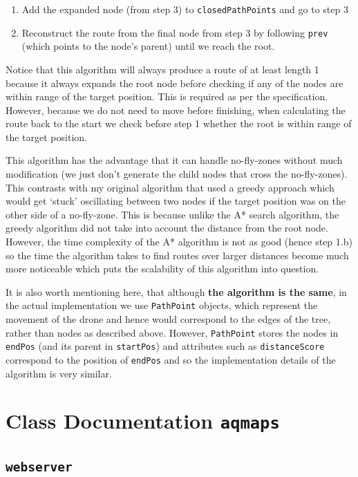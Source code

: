 \documentclass[11pt]{article}
\begin{document}
\begin{enumerate}[topsep=0pt, itemsep=0pt]
  \item Add the expanded node (from step 3) to \texttt{closedPathPoints} and go to step 3

  \item Reconstruct the route from the final node from step 3 by following \texttt{prev} (which points to the node's parent) until we reach the root.
\end{enumerate}

Notice that this algorithm will always produce a route of at least length 1 because it always expands the root node before checking if any of the nodes are within range of the target position. This is required as per the specification. However, because we do not need to move before finishing, when calculating the route back to the start we check before step 1 whether the root is within range of the target position.

This algorithm has the advantage that it can handle no-fly-zones without much modification (we just don't generate the child nodes that cross the no-fly-zones). This contrasts with my original algorithm that used a greedy approach which would get `stuck' oscillating between two nodes if the target position was on the other side of a no-fly-zone. This is because unlike the A* search algorithm, the greedy algorithm did not take into account the distance from the root node. However, the time complexity of the A* algorithm is not as good (hence step 1.b) so the time the algorithm takes to find routes over larger distances become much more noticeable which puts the scalability of this algorithm into question.

It is also worth mentioning here, that although \textbf{the algorithm is the same}, in the actual implementation we use \texttt{PathPoint} objects, which represent the movement of the drone and hence would correspond to the edges of the tree, rather than nodes as described above. However, \texttt{PathPoint} stores the nodes in \texttt{endPos} (and its parent in \texttt{startPos}) and attributes such as \texttt{distanceScore} correspond to the position of \texttt{endPos} and so the implementation details of the algorithm is very similar.

\section{Class Documentation \texttt{aqmaps}}

\subsection{\texttt{webserver}}
\end{document}
